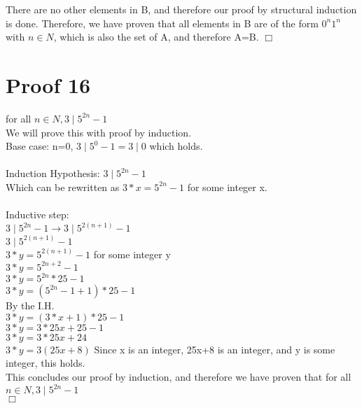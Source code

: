 \documentclass{article}
\begin{document}
There are no other elements in B, and therefore our proof by structural induction is done. Therefore, we have proven that all elements in B are of the form $0^n1^n$ with $n \in N$, which is also the set of A, and therefore A=B.
$\Box$

\section{Proof 16}
for all $n \in N, 3 \mid 5^{2n}-1$\\
We will prove this with proof by induction.\\
Base case: n=0, $3 \mid 5^0-1 = 3 \mid 0 $ which holds.\\
\\
Induction Hypothesis: $3 \mid 5^{2n}-1$\\
Which can be rewritten as $3*x = 5^{2n}-1$ for some integer x.\\
\\
Inductive step:\\
$3 \mid 5^{2n}-1 \rightarrow 3 \mid 5^{2(n+1)}-1$\\
$3 \mid 5^{2(n+1)}-1$\\
$3*y = 5^{2(n+1)}-1$ for some integer y\\
$3*y = 5^{2n+2}-1$\\
$3*y = 5^{2n}*25-1$\\
$3*y = (5^{2n}-1+1)*25-1$\\
By the I.H.\\
$3*y = (3*x+1)*25-1$\\
$3*y = 3*25x+25-1$\\
$3*y = 3*25x+24$\\
$3*y = 3(25x+8)$ Since x is an integer, 25x+8 is an integer, and y is some integer, this holds.\\
This concludes our proof by induction, and therefore we have proven that for all $n \in N, 3 \mid 5^{2n}-1$\\
$\Box$
\end{document}
